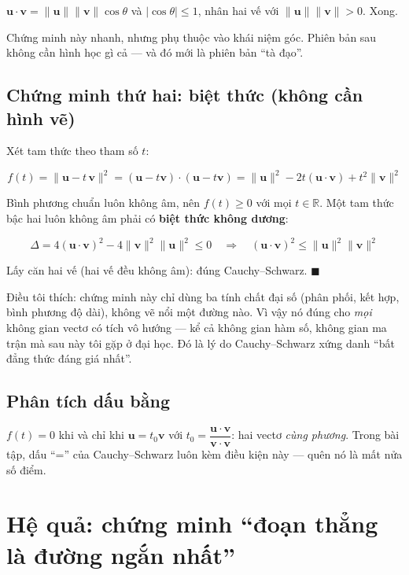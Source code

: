 \documentclass[12pt,a4paper]{article}
\begin{document}
$\mathbf{u}\cdot\mathbf{v} = \|\mathbf{u}\|\|\mathbf{v}\|\cos\theta$ và $|\cos\theta| \le 1$, nhân hai vế với $\|\mathbf{u}\|\|\mathbf{v}\| > 0$. Xong.

Chứng minh này nhanh, nhưng phụ thuộc vào khái niệm góc. Phiên bản sau không cần hình học gì cả --- và đó mới là phiên bản ``tà đạo''.

\subsection*{Chứng minh thứ hai: biệt thức (không cần hình vẽ)}

Xét tam thức theo tham số $t$:

$$
f(t) = \|\mathbf{u} - t\,\mathbf{v}\|^2
= (\mathbf{u}-t\mathbf{v})\cdot(\mathbf{u}-t\mathbf{v})
= \|\mathbf{u}\|^2 - 2t(\mathbf{u}\cdot\mathbf{v}) + t^2\|\mathbf{v}\|^2
$$

Bình phương chuẩn luôn không âm, nên $f(t) \ge 0$ với mọi $t \in \mathbb{R}$. Một tam thức bậc hai luôn không âm phải có \textbf{biệt thức không dương}:

$$
\Delta = 4(\mathbf{u}\cdot\mathbf{v})^2 - 4\|\mathbf{v}\|^2\|\mathbf{u}\|^2 \le 0
\quad\Longrightarrow\quad
(\mathbf{u}\cdot\mathbf{v})^2 \le \|\mathbf{u}\|^2\|\mathbf{v}\|^2
$$

Lấy căn hai vế (hai vế đều không âm): đúng Cauchy--Schwarz. $\blacksquare$

Điều tôi thích: chứng minh này chỉ dùng ba tính chất đại số (phân phối, kết hợp, bình phương độ dài), không vẽ nổi một đường nào. Vì vậy nó đúng cho \emph{mọi} không gian vectơ có tích vô hướng --- kể cả không gian hàm số, không gian ma trận mà sau này tôi gặp ở đại học. Đó là lý do Cauchy--Schwarz xứng danh ``bất đẳng thức đáng giá nhất''.

\subsection*{Phân tích dấu bằng}

$f(t) = 0$ khi và chỉ khi $\mathbf{u} = t_0\mathbf{v}$ với $t_0 = \dfrac{\mathbf{u}\cdot\mathbf{v}}{\mathbf{v}\cdot\mathbf{v}}$: hai vectơ \emph{cùng phương}. Trong bài tập, dấu ``='' của Cauchy--Schwarz luôn kèm điều kiện này --- quên nó là mất nửa số điểm.

\section{Hệ quả: chứng minh ``đoạn thẳng là đường ngắn nhất''}
\end{document}
